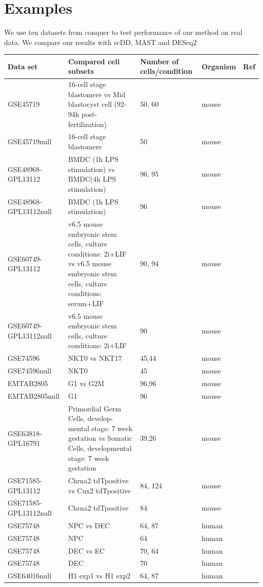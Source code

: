 \documentclass[11pt]{amsart}
\begin{document}
\section{Examples}
We use ten datasets from conquer\cite{ref:Cq} to test performance of our method on real data. We compare our results with scDD\cite{ref:scDD}, MAST\cite{ref:MAST} and DESeq2\cite{ref:Des}\\
\begin{table}[ht]
\centering
\begin{tabular}{ |p{3cm}|p{6cm}|p{2cm}|p{1cm}|p{1cm}|}
\hline
 Data set & Compared cell subsets & Number of cells/condition & Organism & Ref\\
 \hline
 \hline
 GSE45719 & 16-cell stage blastomere vs Mid blastocyst cell (92-94h post- fertilization) & 50, 60 & mouse & \cite{Deng193}\\
 \hline
 GSE45719null &  16-cell stage blastomere & 50 & mouse &  \cite{Deng193}\\
 \hline
 GSE48968-GPL13112 & BMDC (1h LPS stimulation) vs BMDC(4h LPS stimulation) & 96, 95 & mouse & \cite{Shalek}\\
 \hline
 GSE48968-GPL13112null & BMDC (1h LPS stimulation) & 96 & mouse & \cite{Shalek}\\
 \hline
 GSE60749-GPL13112 & v6.5 mouse embryonic stem cells, culture conditions: 2i+LIF vs v6.5 mouse embryonic stem cells, culture conditions: serum+LIF & 90, 94 & mouse & \cite{Kumar}\\
 \hline
 GSE60749-GPL13112null & v6.5 mouse embryonic stem cells, culture conditions: 2i+LIF & 90 & mouse & \cite{Kumar}\\
 \hline
 GSE74596 & NKT0 vs NKT17 & 45,44 & mouse & \cite{Engel}\\
 \hline
 GSE74596null & NKT0 & 45 & mouse & \cite{Engel}\\
 \hline
 EMTAB2805 & G1 vs G2M & 96,96 & mouse & \cite{EMTAB}\\
 \hline
 EMTAB2805null & G1 & 96 & mouse & \cite{EMTAB}\\
 \hline
 GSE63818-GPL16791 & Primordial Germ Cells, develop- mental stage: 7 week gestation vs Somatic Cells, developmental stage: 7 week gestation & 39,26 & mouse & \cite{Guo}\\
 \hline
 GSE71585-GPL13112 & Chrna2 tdTpositive vs Cux2 tdTpositive & 84, 124 & mouse & \cite{Tasic}\\
 \hline
GSE71585-GPL13112null & Chrna2 tdTpositive & 84 & mouse & \cite{Tasic}\\
\hline
GSE75748 & NPC vs DEC & 64, 87 & human & \cite{chu}\\
\hline
GSE75748 & NPC & 64 & human & \cite{chu}\\
\hline
GSE75748 & DEC vs EC & 70, 64 & human & \cite{chu}\\
\hline
GSE75748 & DEC & 70 & human & \cite{chu}\\
\hline
GSE64016null & H1 exp1 vs H1 exp2 & 64, 87 & human & \cite{oscope}\\
\hline
\end{tabular}
\end{table}
\end{document}
